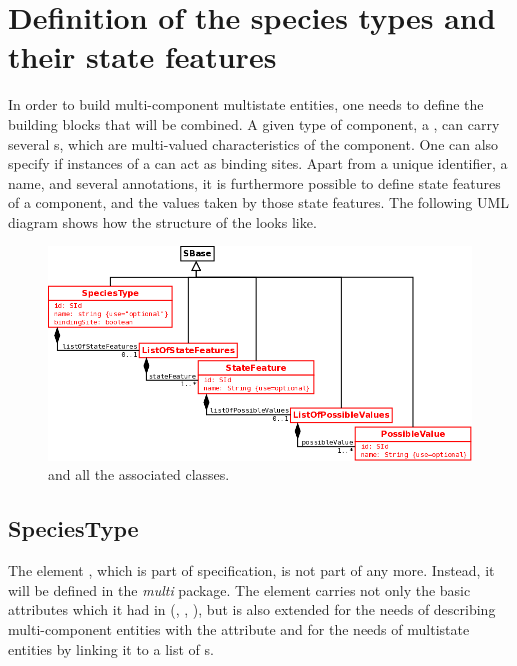\section{Definition of the species types and their state features}

In order to build multi-component multistate entities, one needs to define the building blocks that will be combined. A given type of component, a ,  can carry several s, which are multi-valued characteristics of the component. One can also specify if instances of a  can act as binding sites. Apart from a unique identifier, a name, and several annotations, it is furthermore possible to define state features of a component, and the values taken by those state features.  The following UML diagram shows how the structure of the  looks like. 

\begin{figure}[H]
\begin{center}
\includegraphics[scale=0.3]{figs/pngs/SpeciesTypeGeneral.png} 
\caption{ and all the associated classes.}
\label{fig:SpeciesTypeGeneral}
\end{center}
\end{figure}

\subsection{SpeciesType} 

The element , which is part of \sbmlLtwoVfour specification, is not part of \sbmlLthreeVone any more. Instead, it will be defined in the \emph{multi} package. The  element carries not only the basic attributes which it had in \sbmlLtwoVfour (, , ), but is also extended for the needs of describing multi-component entities with the attribute  and for the needs of multistate entities by linking it to a list of  s.

